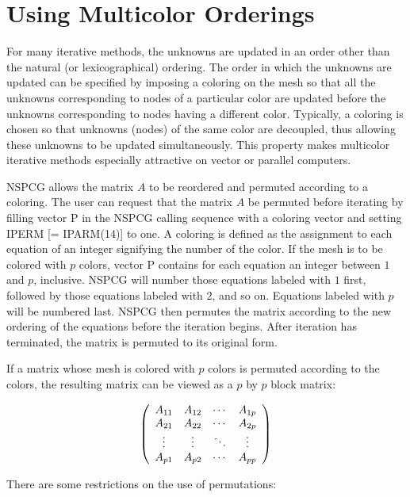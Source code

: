 \newpage
\section{Using Multicolor Orderings}
\label{mc}
\indent
 
   For many iterative methods, the unknowns are updated in an order
other than the natural (or lexicographical) ordering.  The order
in which the unknowns are updated can be specified by imposing a
coloring on the mesh so that all the unknowns corresponding to nodes 
of a particular color are updated before the unknowns corresponding 
to nodes having a different color.  Typically, a coloring is chosen
so that unknowns (nodes) of the same color are decoupled, thus
allowing these unknowns to be updated simultaneously.  This
property makes multicolor iterative methods especially attractive
on vector or parallel computers.

   NSPCG allows the matrix $A$ to be reordered and permuted
according to a coloring.  The user can request that the matrix $A$ 
be permuted before iterating by filling vector P in the NSPCG calling
sequence with a coloring vector and setting IPERM [= IPARM(14)] to 
one.  A coloring is defined as the assignment to each equation of 
an integer signifying the number of the color.  If the mesh is to be 
colored with $p$ colors, vector P contains for each equation 
an integer between $1$ and $p$, inclusive.  NSPCG will number those 
equations labeled with $1$ first, followed by those equations labeled 
with $2$, and so on.  Equations labeled with $p$ will be numbered 
last.  NSPCG then permutes the matrix according to the new ordering
of the equations before the iteration begins.  After iteration has
terminated, the matrix is permuted to its original form.

   If a matrix whose mesh is colored with $p$ colors is permuted
according to the colors, the resulting matrix can be viewed as a 
$p$ by $p$ block matrix:
 
\[ \left( \begin{array}{cccc}
                 A_{11} & A_{12} & \cdots & A_{1p} \\
                 A_{21} & A_{22} & \cdots & A_{2p} \\
                 \vdots & \vdots & \ddots & \vdots \\
                 A_{p1} & A_{p2} & \cdots & A_{pp}
  \end{array} \right) \]
 
There are some restrictions on the use of permutations:

